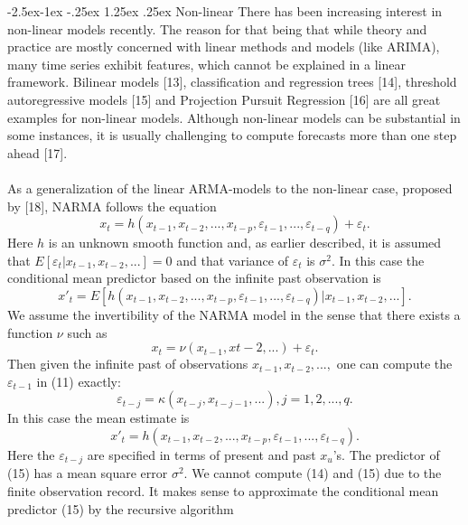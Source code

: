 \documentclass[runningheads,a4paper]{llncs}[2015/06/24]
\makeatletter
\renewcommand\paragraph{\@startsection{paragraph}{4}{\z@}%
            {-2.5ex\@plus -1ex \@minus -.25ex}%
            {1.25ex \@plus .25ex}%
            {\normalfont\normalsize\bfseries}}
\makeatother
\begin{document}
\paragraph{Non-linear}
There has been increasing interest in non-linear models recently. The reason for that being that while theory and practice are mostly concerned with linear methods and models (like ARIMA), many time series exhibit features, which cannot be explained in a linear framework. Bilinear models [13], classification and regression trees [14], threshold autoregressive models [15] and Projection Pursuit Regression [16] are all great examples for non-linear models. Although non-linear models can be substantial in some instances, it is usually challenging to compute forecasts more than one step ahead [17]. \\\\ As a generalization of the linear ARMA-models to the non-linear case, proposed by [18], NARMA follows the equation
\begin{equation}
x_t = h(x_{t−1}, x_{t−2},..., x_{t−p}, ε_{t−1},...,ε_{t−q} ) + ε_t .
\end{equation}
Here $h$ is an unknown smooth function and, as earlier described, it is assumed that $E[ε_t|x_{t−1}, x_{t−2},...] = 0$ and that variance of $ε_t$ is $σ^2$. In this case the conditional mean predictor based on the infinite past observation is
\begin{equation}
x'_t = E[h(x_{t−1}, x_{t−2},..., x_{t−p}, ε_{t−1},...,ε_{t−q} )|x_{t−1}, x_{t−2},...]. 
\end{equation}
We assume the invertibility of the NARMA model in the sense that there exists a function $ν$ such as
\begin{equation}
x_t = ν(x_{t−1}, x{t−2}, . . .) + ε_t . 
\end{equation}
Then given the infinite past of observations $x_{t−1}, x_{t−2},...,$ one can compute the $ε_{t−1}$ in (11) exactly:
\begin{equation}
ε_{t−j} = κ(x_{t− j}, x_{t− j−1}, . . .), j = 1, 2,..., q. 
\end{equation}
In this case the mean estimate is
\begin{equation}
x'_t = h(x_{t−1}, x_{t−2},..., x_{t−p}, ε_{t−1},...,ε_{t−q} ).
\end{equation}
Here the $ε_{t− j}$ are specified in terms of present and past $x_u$’s. The predictor of (15) has a mean square error $σ^2$. We cannot compute (14) and (15) due to the finite observation record. It makes sense to approximate the conditional mean predictor (15) by the recursive algorithm
\end{document}
